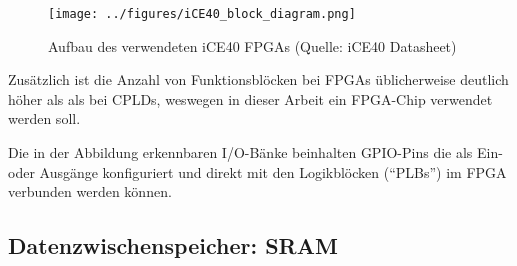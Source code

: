 \begin{figure}[htbp]
	\centering
		\texttt{[image: ../figures/iCE40\_block\_diagram.png]}
	\caption[Blockdiagramm des verwendeten iCE40 FPGAs]{Aufbau des verwendeten iCE40 FPGAs (Quelle: iCE40 Datasheet{\cite{doc:datasheet}})}
	\label{fig:ice40_block_diagram}
\end{figure}

Zusätzlich ist die Anzahl von Funktionsblöcken bei FPGAs üblicherweise deutlich höher als als bei CPLDs, weswegen in dieser Arbeit ein FPGA-Chip verwendet werden soll.

Die in der Abbildung erkennbaren I/O-Bänke beinhalten GPIO-Pins die als Ein- oder Ausgänge konfiguriert und direkt mit den Logikblöcken (``PLBs'') im FPGA verbunden werden können.

\subsection{Datenzwischenspeicher: SRAM}

